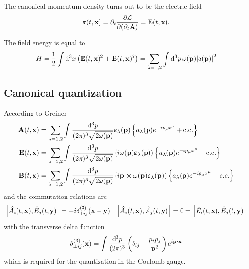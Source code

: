 \begin{lemma}
	The canonical momentum density turns out to be the electric field
	\begin{equation}
		\pi(t,\vb{x})
		=
		\partial_t\pdv{\mathcal{L}}{(\partial_t\vb{A})}
		=
		\vb{E}(t,\vb{x})
		\label{eq:mw_mom}.
	\end{equation}
\end{lemma}
\begin{lemma}\label{thm:mw_energy}
	The field energy is equal to
	\begin{equation}
		H
		=
		\frac{1}{2}
		\int\dd[3]{x}
		\left(
			\vb{E}(t,\vb{x})^2
			+
			\vb{B}(t,\vb{x})^2
		\right)
		=
		\sum_{\lambda=1,2}
		\int\dd[3]{p}
		\omega(\vb{p})
		\abs{a(\vb{p})}^2
	\end{equation}
\end{lemma}

\subsection{Canonical quantization}

According to Greiner~\cite[p.~196]{Greiner2013}
\begin{align}
	\vb{A}(t,\vb{x})
	&=
	\sum_{\lambda=1,2}
	\int\frac{\dd[3]{p}}{(2\pi)^3\sqrt{2\omega(\vb{p})}}
	\boldsymbol{\varepsilon}_\lambda(\vb{p})
	\left\{
		a_\lambda(\vb{p})
		e^{-ip_\mu x^\mu}
		+
		\text{c.c.}
	\right\}
	\label{eq:qmw_pos}
	\\
	\vb{E}(t,\vb{x})
	&=
	\sum_{\lambda=1,2}
	\int\frac{\dd[3]{p}}{(2\pi)^3\sqrt{2\omega(\vb{p})}}
	\left(
		i\omega(\vb{p})
		\boldsymbol{\varepsilon}_\lambda(\vb{p})
	\right)
	\left\{
		a_\lambda(\vb{p})
		e^{-ip_\mu x^\mu}
		-
		\text{c.c.}
	\right\}
	\label{eq:qmw_mom}
	\\
	\vb{B}(t,\vb{x})
	&=
	\sum_{\lambda=1,2}
	\int\frac{\dd[3]{p}}{(2\pi)^3\sqrt{2\omega(\vb{p})}}
	\left(
		i\vb{p}\cross\omega(\vb{p})
		\boldsymbol{\varepsilon}_\lambda(\vb{p})
	\right)
	\left\{
		a_\lambda(\vb{p})
		e^{-ip_\mu x^\mu}
		-
		\text{c.c.}
	\right\}
	\label{eq:qmw_mag}
\end{align}
and the commutation relations are
\begin{align}
	\comm{\hat{A}_i(t,\vb{x})}{\hat{E}_j(t,\vb{y})}
	=
	-i\delta^{(3)}_{\perp ij}(\vb{x}-\vb{y})
	&&
	\comm{\hat{A}_i(t,\vb{x})}{\hat{A}_j(t,\vb{y})}
	=
	0
	=
	\comm{\hat{E}_i(t,\vb{x})}{\hat{E}_j(t,\vb{y})}
\end{align}
with the transverse delta function
\begin{equation}
	\delta^{(3)}_{\perp ij}(\vb{x})
	=
	\int\frac{\dd[3]{p}}{(2\pi)^3}
	\left(\delta_{ij}-\frac{p_ip_j}{\vb{p}^2}\right)
	e^{i\vb{p}\vdot\vb{x}}
	\label{eq:transverse_delta}
\end{equation}
which is required for the quantization in the Coulomb gauge.

